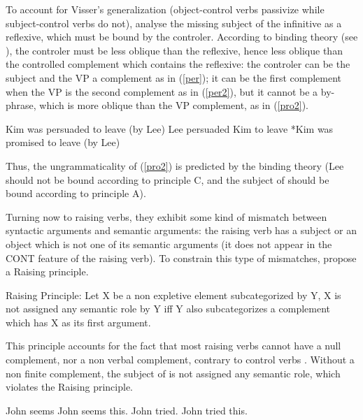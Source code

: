 \documentclass[output=paper]{langsci/langscibook}
\begin{document}
To account for Visser's generalization (object-control verbs passivize  while subject-control verbs do not), \citet{SagandPollard1991} analyse the missing subject of the infinitive as a reflexive, which must be bound by the controler. According to binding theory (see ), the controler must be less oblique than the reflexive, hence less oblique than the controlled complement which contains the reflexive: the controler can be the subject and the VP a complement as in (\ref{per}); it can be the first complement when the VP is the second complement as in (\ref{per2}), but it cannot be a  by-phrase, which is more oblique than the VP complement, as in (\ref{pro2}).

\begin{exe}
\ex \begin{xlist}
\ex \label{per} Kim was persuaded to leave (by Lee) 
\ex \label{per2} Lee persuaded Kim to leave 
\ex \label{pro2}*Kim was promised to leave (by Lee) 
\end{xlist}	
\end{exe}

Thus, the ungrammaticality of (\ref{pro2}) is predicted by the binding theory (Lee should not be bound according to principle C, and the subject of  should be bound according to principle A).

Turning now to raising verbs, they exhibit some kind of mismatch between syntactic arguments and semantic arguments: the raising verb has a subject or an object which is not one of its semantic arguments (it does not appear in the CONT feature of the raising verb). To constrain this type of mismatches, \citet[140]{PollardandSag1994}propose a Raising principle.

\begin{exe}
\ex Raising Principle: Let X be a non expletive element subcategorized by Y, X is not assigned any semantic role by Y iff Y also subcategorizes a complement which has X as its first argument.
\end{exe}

This principle accounts for the fact  that most raising verbs cannot have a null complement, nor a non verbal complement, contrary to control verbs \citep{Jacobson1990}. Without a non finite complement, the subject of  is not assigned any semantic role, which violates the Raising principle.

\begin{exe}
\ex \begin{xlist}
\ex * John seems
\ex * John seems this.
\ex John tried.
\ex John tried this.
\end{xlist}	
	
\end{exe}
\end{document}
